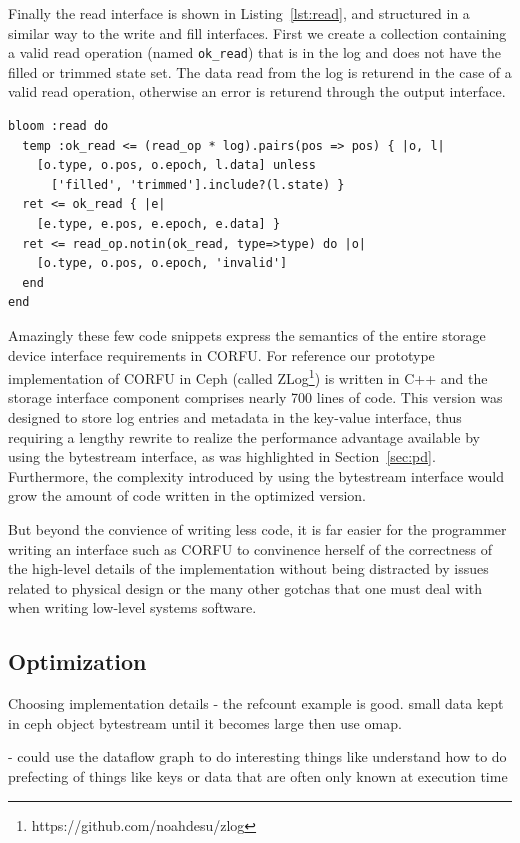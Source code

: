 \documentclass[10pt,twocolumn]{article}
\begin{document}
Finally the read interface is shown in Listing~\ref{lst:read}, and structured
in a similar way to the write and fill interfaces. First we create a collection
containing a valid read operation (named \texttt{ok\_read}) that is in the log
and does not have the filled or trimmed state set.  The data read from the log
is returend in the case of a valid read operation, otherwise an error is
returend through the output interface.

\begin{lstlisting}[caption={Read}, label=lst:read]
bloom :read do
  temp :ok_read <= (read_op * log).pairs(pos => pos) { |o, l|
    [o.type, o.pos, o.epoch, l.data] unless
      ['filled', 'trimmed'].include?(l.state) }
  ret <= ok_read { |e|
    [e.type, e.pos, e.epoch, e.data] }
  ret <= read_op.notin(ok_read, type=>type) do |o|
    [o.type, o.pos, o.epoch, 'invalid']
  end
end
\end{lstlisting}

Amazingly these few code snippets express the semantics of the entire storage
device interface requirements in CORFU. For reference our prototype
implementation of CORFU in Ceph (called
ZLog\footnote{https://github.com/noahdesu/zlog})
is written in C++ and the storage interface component comprises nearly 700
lines of code. This version
was designed to store log entries and metadata in the key-value interface,
thus requiring a lengthy rewrite to realize the performance advantage
available by using the bytestream interface, as was highlighted in
Section~\ref{sec:pd}. Furthermore, the complexity introduced by using the
bytestream interface would grow the amount of code written in the optimized
version.

But beyond the convience of writing less code, it is far easier for the
programmer writing an interface such as CORFU to convinence herself of the
correctness of the high-level details of the implementation without being
distracted by issues related to physical design or the many other gotchas that
one must deal with when writing low-level systems software.

\subsection{Optimization}

Choosing implementation details
  - the refcount example is good. small data kept in ceph object bytestream
until it becomes large then use omap.

  - could use the dataflow graph to do interesting things like understand how
  to do prefecting of things like keys or data that are often only known at
  execution time
\end{document}
